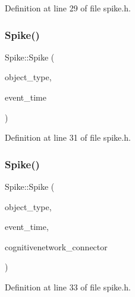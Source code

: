 Definition at line 29 of file spike.\+h.

\mbox{\label{class_spike_a9368fb7b20887e5f02f3de6176f04c02}} 
\subsubsection{\texorpdfstring{Spike()}{Spike()}\hspace{0.1cm}{\footnotesize\ttfamily [3/4]}}
{\footnotesize\ttfamily Spike\+::\+Spike (\begin{DoxyParamCaption}\item[{unsigned int}]{object\+\_\+type,  }\item[{std\+::chrono\+::time\+\_\+point$<$ \hyperlink{universe_8h_a0ef8d951d1ca5ab3cfaf7ab4c7a6fd80}{Clock} $>$}]{event\+\_\+time }\end{DoxyParamCaption})\hspace{0.3cm}{\ttfamily [inline]}}



Definition at line 31 of file spike.\+h.

\mbox{\label{class_spike_afecf811f48103b529016a73349b50fe4}} 
\subsubsection{\texorpdfstring{Spike()}{Spike()}\hspace{0.1cm}{\footnotesize\ttfamily [4/4]}}
{\footnotesize\ttfamily Spike\+::\+Spike (\begin{DoxyParamCaption}\item[{unsigned int}]{object\+\_\+type,  }\item[{std\+::chrono\+::time\+\_\+point$<$ \hyperlink{universe_8h_a0ef8d951d1ca5ab3cfaf7ab4c7a6fd80}{Clock} $>$}]{event\+\_\+time,  }\item[{\hyperlink{class_cognitive_network}{Cognitive\+Network} \&}]{cognitivenetwork\+\_\+connector }\end{DoxyParamCaption})\hspace{0.3cm}{\ttfamily [inline]}}



Definition at line 33 of file spike.\+h.

